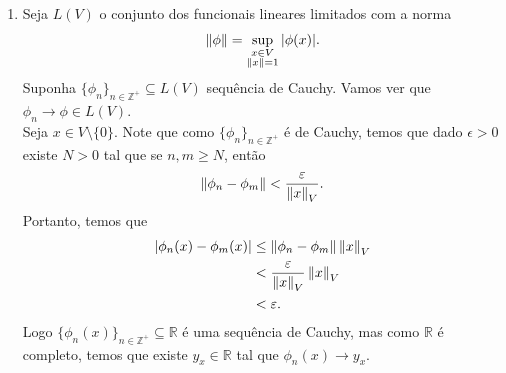 \begin{homeworkProblem}[4]
\begin{solution}
\begin{enumerate}
\begin{align*}
      \end{align*}
      Portanto, note que se $x\in V\setminus\{0\}$ com $\norm{x}\leq 1$ se cumpre que
      \begin{align*}
        |\phi(x)|\leq \frac{|\phi(x)|}{\norm{x}}.
      \end{align*}
      Logo como $\{x\in V:\norm{x}\leq 1\}\subseteq V\setminus\{0\}$, temos que 
      \begin{align*}
        \sup\left\{ |\phi(x)|:x\in V\setminus\{0\},\norm{x}\leq 1 \right\}\leq\sup_{x\neq 0}\frac{|\phi(x)|}{\norm{x}}.
      \end{align*}
      Pelo que podemos concluir que
      \begin{align*}
        \sup\left\{ |\phi(x)|:x\in V,\norm{x}\leq 1 \right\}=\sup_{x\neq 0}\frac{|\phi(x)|}{\norm{x}}.
      \end{align*}
      O que nos permite garantir que as 3 quantidades são iguais.\\
      Para finalizar, note que nos definimos $\left\{ \phi \right\}=\sup\left\{ |\phi(x)|:x\in V,\norm{x}\leq 1 \right\}$, pelo que podemos afirmar que $\phi$ é limitado se, e somente se, as 3 quantidades são finitas.
    \item Seja $L(V)$ o conjunto dos funcionais lineares limitados com a norma
      \begin{align*}
        \left\|\phi\right\|=\sup_{\substack{x\in V\\\left\|x\right\|=1}}|\phi(x)|.
      \end{align*}
      Suponha $\{\phi_n\}_{n\in\mathbb{Z}^{+}}\subseteq L(V)$ sequência de Cauchy. Vamos ver que $\phi_n\to\phi\in L(V)$.\\
      Seja $x\in V\setminus\{0\}$. Note que como $\{\phi_n\}_{n\in\mathbb{Z}^{+}}$ é de Cauchy, temos que dado $\epsilon>0$ existe $N>0$ tal que se $n,m\geq N$, então
      \begin{align*}
        \left\|\phi_n-\phi_m\right\|<\frac{\varepsilon}{\left\|x\right\|_{V}}.
      \end{align*}
      Portanto, temos que  
      \begin{align*}
        \left|\phi_n(x)-\phi_m(x)\right|&\leq \left\|\phi_n-\phi_m\right\|\left\|x\right\|_{V}\\
        &<\frac{\varepsilon}{\left\|x\right\|_{V}}\left\|x\right\|_{V}\\
        &<\varepsilon.
      \end{align*}
      Logo $\{\phi_n(x)\}_{n\in\mathbb{Z}^{+}}\subseteq \mathbb{R}$ é uma sequência de Cauchy, mas como $\mathbb{R}$ é completo, temos  que existe $y_x\in \mathbb{R}$ tal que $\phi_{n}(x)\to y_x$.\\

\end{enumerate}
\end{solution}
\end{homeworkProblem}
